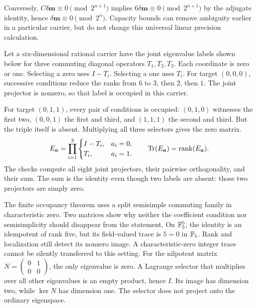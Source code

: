 Conversely, $C\delta\bm m\equiv0\pmod{2^{n+1}}$ implies $6\delta\bm m\equiv0\pmod{2^{n+1}}$ by the adjugate identity, hence $\delta\bm m\equiv0\pmod{2^n}$. Capacity bounds can remove ambiguity earlier in a particular carrier, but do not change this universal linear precision calculation.

Let a six-dimensional rational carrier have the joint eigenvalue labels shown below for three commuting diagonal operators $T_1,T_2,T_3$. Each coordinate is zero or one. Selecting a zero uses $I-T_i$. Selecting a one uses $T_i$.
For target $(0,0,0)$, successive conditions reduce the ranks from $6$ to $3$, then $2$, then $1$. The joint projector is nonzero, so that label is occupied in this carrier.

For target $(0,1,1)$, every pair of conditions is occupied: $(0,1,0)$ witnesses the first two, $(0,0,1)$ the first and third, and $(1,1,1)$ the second and third. But the triple itself is absent. Multiplying all three selectors gives the zero matrix.
\[
E_{\bm a}=\prod_{i=1}^{3}
\begin{cases}I-T_i,&a_i=0,\\T_i,&a_i=1.\end{cases}
\qquad \operatorname{Tr}(E_{\bm a})=\operatorname{rank}(E_{\bm a}).
\]
The checks compute all eight joint projectors, their pairwise orthogonality, and their sum. The sum is the identity even though two labels are absent: those two projectors are simply zero.

The finite occupancy theorem uses a split semisimple commuting family in characteristic zero. Two matrices show why neither the coefficient condition nor semisimplicity should disappear from the statement.
On $\mathbb F_5^5$, the identity is an idempotent of rank five, but its field-valued trace is $5=0$ in $\mathbb F_5$. Rank and localization still detect its nonzero image. A characteristic-zero integer trace cannot be silently transferred to this setting.
For the nilpotent matrix $N=\left(\begin{smallmatrix}0&1\\0&0\end{smallmatrix}\right)$, the only eigenvalue is zero. A Lagrange selector that multiplies over all other eigenvalues is an empty product, hence $I$. Its image has dimension two, while $\ker N$ has dimension one. The selector does not project onto the ordinary eigenspace.

